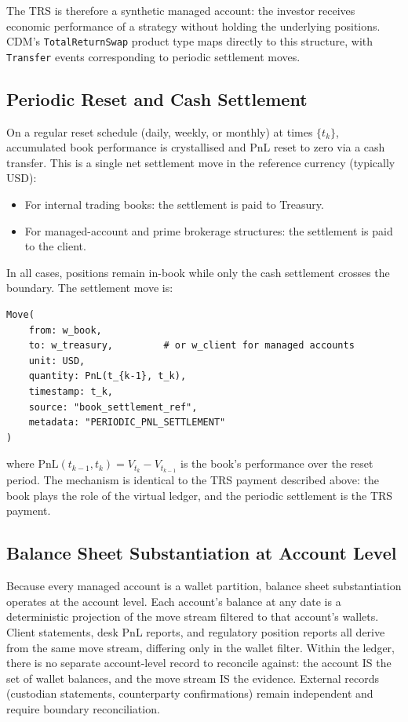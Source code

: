 \documentclass[11pt,a4paper]{article}
\begin{document}
The TRS is therefore a synthetic managed account: the investor receives economic performance of a strategy without holding the underlying positions. CDM's \texttt{TotalReturnSwap} product type maps directly to this structure, with \texttt{Transfer} events corresponding to periodic settlement moves.

\subsection{Periodic Reset and Cash Settlement}

On a regular reset schedule (daily, weekly, or monthly) at times $\{t_k\}$, accumulated book performance is crystallised and PnL reset to zero via a cash transfer. This is a single net settlement move in the reference currency (typically USD):

\begin{itemize}
\item For internal trading books: the settlement is paid to Treasury.
\item For managed-account and prime brokerage structures: the settlement is paid to the client.
\end{itemize}

In all cases, positions remain in-book while only the cash settlement crosses the boundary. The settlement move is:

\begin{lstlisting}
Move(
    from: w_book,
    to: w_treasury,         # or w_client for managed accounts
    unit: USD,
    quantity: PnL(t_{k-1}, t_k),
    timestamp: t_k,
    source: "book_settlement_ref",
    metadata: "PERIODIC_PNL_SETTLEMENT"
)
\end{lstlisting}

where $\text{PnL}(t_{k-1}, t_k) = V_{t_k} - V_{t_{k-1}}$ is the book's performance over the reset period. The mechanism is identical to the TRS payment described above: the book plays the role of the virtual ledger, and the periodic settlement is the TRS payment.

\subsection{Balance Sheet Substantiation at Account Level}

Because every managed account is a wallet partition, balance sheet substantiation operates at the account level. Each account's balance at any date is a deterministic projection of the move stream filtered to that account's wallets. Client statements, desk PnL reports, and regulatory position reports all derive from the same move stream, differing only in the wallet filter. Within the ledger, there is no separate account-level record to reconcile against: the account IS the set of wallet balances, and the move stream IS the evidence. External records (custodian statements, counterparty confirmations) remain independent and require boundary reconciliation.
\end{document}
